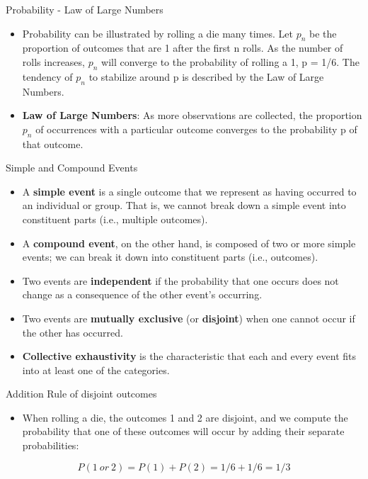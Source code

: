 \documentclass[
  ignorenonframetext,
]{beamer}
\providecommand{\tightlist}{%
  \setlength{\itemsep}{0pt}\setlength{\parskip}{0pt}}
\begin{document}
\begin{frame}{Probability - Law of Large Numbers}
\protect\hypertarget{probability---law-of-large-numbers}{}

\begin{itemize}
\item
  Probability can be illustrated by rolling a die many times. Let
  \(p_{n}\) be the proportion of outcomes that are 1 after the first n
  rolls. As the number of rolls increases, \(p_{n}\) will converge to
  the probability of rolling a 1, p = 1/6. The tendency of \(p_{n}\) to
  stabilize around p is described by the Law of Large Numbers.
\item
  \textbf{Law of Large Numbers}: As more observations are collected, the
  proportion \(p_{n}\) of occurrences with a particular outcome
  converges to the probability p of that outcome.
\end{itemize}

\end{frame}

\begin{frame}{Simple and Compound Events}
\protect\hypertarget{simple-and-compound-events}{}

\begin{itemize}
\item
  A \textbf{simple event} is a single outcome that we represent as
  having occurred to an individual or group. That is, we cannot break
  down a simple event into constituent parts (i.e., multiple outcomes).
\item
  A \textbf{compound event}, on the other hand, is composed of two or
  more simple events; we can break it down into constituent parts (i.e.,
  outcomes).
\item
  Two events are \textbf{independent} if the probability that one occurs
  does not change as a consequence of the other event's occurring.
\item
  Two events are \textbf{mutually exclusive} (or \textbf{disjoint}) when
  one cannot occur if the other has occurred.
\item
  \textbf{Collective exhaustivity} is the characteristic that each and
  every event fits into at least one of the categories.
\end{itemize}

\end{frame}

\begin{frame}{Addition Rule of disjoint outcomes}
\protect\hypertarget{addition-rule-of-disjoint-outcomes}{}

\begin{itemize}
\tightlist
\item
  When rolling a die, the outcomes 1 and 2 are disjoint, and we compute
  the probability that one of these outcomes will occur by adding their
  separate probabilities:
\end{itemize}

\[P (1 \ or \ 2) = P (1) + P (2) = 1/6 + 1/6 = 1/3\]

\end{frame}
\end{document}
